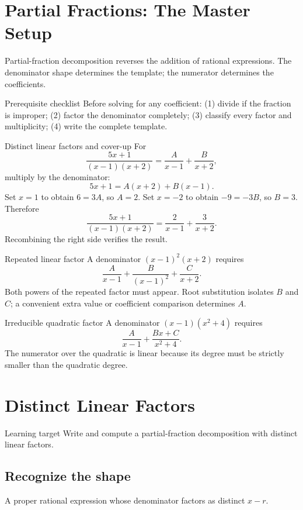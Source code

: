 \documentclass[11pt,oneside]{book}
\begin{document}
\chapter*{Partial Fractions: The Master Setup}
Partial-fraction decomposition reverses the addition of rational expressions. The denominator shape determines the template; the numerator determines the coefficients.
\begin{rulebox}{Prerequisite checklist}
Before solving for any coefficient: (1) divide if the fraction is improper; (2) factor the denominator completely; (3) classify every factor and multiplicity; (4) write the complete template.
\end{rulebox}
\begin{examplebox}{Distinct linear factors and cover-up}
For
\[
\frac{5x+1}{(x-1)(x+2)}=\frac{A}{x-1}+\frac{B}{x+2},
\]
multiply by the denominator:
\[
5x+1=A(x+2)+B(x-1).
\]
Set $x=1$ to obtain $6=3A$, so $A=2$. Set $x=-2$ to obtain $-9=-3B$, so $B=3$. Therefore
\[
\frac{5x+1}{(x-1)(x+2)}=\frac{2}{x-1}+\frac{3}{x+2}.
\]
Recombining the right side verifies the result.
\end{examplebox}
\begin{examplebox}{Repeated linear factor}
A denominator $(x-1)^2(x+2)$ requires
\[
\frac{A}{x-1}+\frac{B}{(x-1)^2}+\frac{C}{x+2}.
\]
Both powers of the repeated factor must appear. Root substitution isolates $B$ and $C$; a convenient extra value or coefficient comparison determines $A$.
\end{examplebox}
\begin{examplebox}{Irreducible quadratic factor}
A denominator $(x-1)(x^2+4)$ requires
\[
\frac{A}{x-1}+\frac{Bx+C}{x^2+4}.
\]
The numerator over the quadratic is linear because its degree must be strictly smaller than the quadratic degree.
\end{examplebox}
\chapter{Distinct Linear Factors}
\begin{rulebox}{Learning target}
Write and compute a partial-fraction decomposition with distinct linear factors.
\end{rulebox}
\section{Recognize the shape}
A proper rational expression whose denominator factors as distinct $x-r$.
\end{document}
